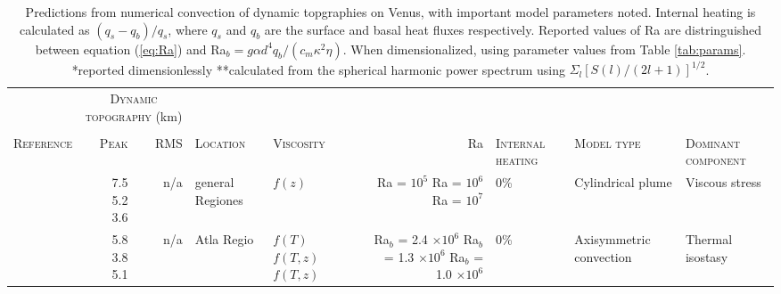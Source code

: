 \begin{landscape}
\thispagestyle{empty}

\footnotesize


\begin{longtable}{ @{} p{4cm} r r p{2cm} p{2cm} r p{1.5cm} p{3.2cm} p{3.1cm} @{} } 
\caption{Predictions from numerical convection of dynamic topgraphies on Venus, with important model parameters noted. Internal heating is calculated as $(q_s - q_b)/q_s$, where $q_s$ and $q_b$ are the surface and basal heat fluxes respectively. Reported values of Ra are distringuished between equation (\ref{eq:Ra}) and Ra$_b = g\alpha d^4 q_b/(c_m \kappa^2 \eta)$. When dimensionalized, using parameter values from Table \ref{tab:params}.\;\; *reported dimensionlessly \;\;   **calculated from the spherical harmonic power spectrum using $\Sigma_l [S(l)/(2l + 1)]^{1/2}$.} \label{tab:dyn_topo_obvs}\\



\toprule
\; & \multicolumn{2}{c}{\textsc{Dynamic topography} (km)} \\
\cline{2-3} \\
\textsc{Reference} & \textsc{Peak} & \textsc{RMS} & \textsc{Location} & \textsc{Viscosity} & Ra & \textsc{Internal heating} & \textsc{Model type} & \textsc{Dominant component}\\
\midrule 

\citet{Kiefer1991} & \makecell[tr]{7.5 \\ 5.2 \\ 3.6} & n/a  & general Regiones &  $f(z)$ & \makecell[tr]{Ra = $10^5$ \\ Ra = $10^6$ \\ Ra = $10^7$} & 0\% & Cylindrical plume & Viscous stress  \\




\citet{Moresi1995} & \makecell[tr]{5.8 \\ 3.8 \\ 5.1} & n/a & Atla Regio  &  \makecell[tl]{$f(T)$ \\ $f(T,z)$ \\ $f(T,z)$} & \makecell[tr]{Ra$_b$ = 2.4 $\times 10^6$ \\ Ra$_b$ = 1.3 $\times 10^6$ \\ Ra$_b$ = 1.0 $\times 10^6$} & 0\% & Axisymmetric convection & Thermal isostasy  \\


\end{longtable}
\end{landscape}
